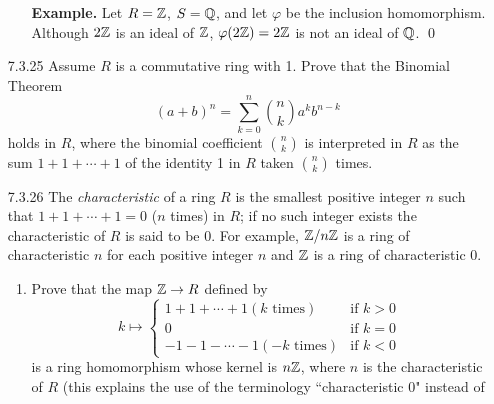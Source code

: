 \begin{enumerate}
\begin{enumerate}
               \textbf{Example.} Let $R = \mathbb{Z}$, $S = \mathbb{Q}$, and let $\varphi$ be
               the inclusion homomorphism. Although $2\mathbb{Z}$ is an ideal of $\mathbb{Z}$,
               $\varphi(2\mathbb{Z}) = 2\mathbb{Z}$ is not an ideal of $\mathbb{Q}$. \qed
      \end{enumerate}
   \item[7.3.25]  Assume $R$ is a commutative ring with 1. Prove that the
                  Binomial Theorem
                  $$(a + b)^n = \sum_{k=0}^n\binom{n}{k}a^kb^{n-k}$$
                  holds in $R$, where the binomial coefficient $\binom{n}{k}$ is
                  interpreted in $R$ as the sum $1 + 1 + \cdots + 1$ of the
                  identity 1 in $R$ taken $\binom{n}{k}$ times.
   \item[7.3.26]  The \textit{characteristic} of a ring $R$ is the smallest
                  positive integer $n$ such that $1 + 1 + \cdots + 1 = 0$
                  ($n$ times) in $R$; if no such integer exists the 
                  characteristic of $R$ is said to be 0. For example,
                  $\mathbb{Z}/n\mathbb{Z}$ is a ring of characteristic $n$ for each positive 
                  integer $n$ and $\mathbb{Z}$ is a ring of characteristic 0.
                  \begin{enumerate}
                     \item Prove that the map $\mathbb{Z} \rightarrow R$ defined by
                           \begin{equation*}
                              k \mapsto \left\{
                                 \begin{array}{ll}
                                    1 + 1 + \cdots + 1 (k \text{ times}) &
                                       \text{if } k > 0 \\
                                    0 & \text{if } k = 0 \\
                                    -1 - 1 - \cdots - 1 (-k \text{ times}) &
                                       \text{if } k < 0
                                 \end{array} \right.
                           \end{equation*}
                           is a ring homomorphism whose kernel is $n\mathbb{Z}$, where
                           $n$ is the characteristic of $R$ (this explains the
                           use of the terminology ``characteristic 0" instead of

\end{enumerate}
\end{enumerate}
